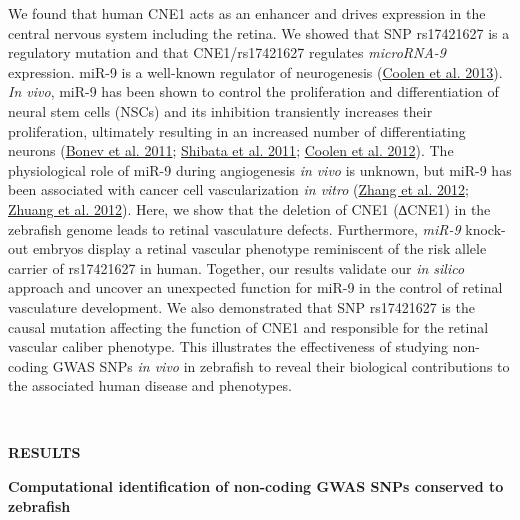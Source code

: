 \documentclass[]{article}
\begin{document}
We found that human CNE1 acts as an enhancer and drives expression in
the central nervous system including the retina. We showed that SNP
rs17421627 is a regulatory mutation and that CNE1/rs17421627 regulates
\emph{microRNA-9} expression. miR-9 is a well-known regulator of
neurogenesis (\protect\hyperlink{_ENREF_4}{Coolen et al. 2013}).
\emph{In vivo}, miR-9 has been shown to control the proliferation and
differentiation of neural stem cells (NSCs) and its inhibition
transiently increases their proliferation, ultimately resulting in an
increased number of differentiating neurons
(\protect\hyperlink{_ENREF_1}{Bonev et al. 2011};
\protect\hyperlink{_ENREF_28}{Shibata et al. 2011};
\protect\hyperlink{_ENREF_5}{Coolen et al. 2012}). The physiological
role of miR-9 during angiogenesis \emph{in} \emph{vivo} is unknown, but
miR-9 has been associated with cancer cell vascularization \emph{in
vitro} (\protect\hyperlink{_ENREF_36}{Zhang et al. 2012};
\protect\hyperlink{_ENREF_38}{Zhuang et al. 2012}). Here, we show that
the deletion of CNE1 (∆CNE1) in the zebrafish genome leads to retinal
vasculature defects. Furthermore, \emph{miR-9} knock-out embryos display
a retinal vascular phenotype reminiscent of the risk allele carrier of
rs17421627 in human. Together, our results validate our \emph{in silico}
approach and uncover an unexpected function for miR-9 in the control of
retinal vasculature development. We also demonstrated that SNP
rs17421627 is the causal mutation affecting the function of CNE1 and
responsible for the retinal vascular caliber phenotype. This illustrates
the effectiveness of studying non-coding GWAS SNPs \emph{in vivo} in
zebrafish to reveal their biological contributions to the associated
human disease and phenotypes.

\textbf{\\
}

\textbf{RESULTS}

\textbf{Computational identification of non-coding GWAS SNPs conserved
to zebrafish}
\end{document}
